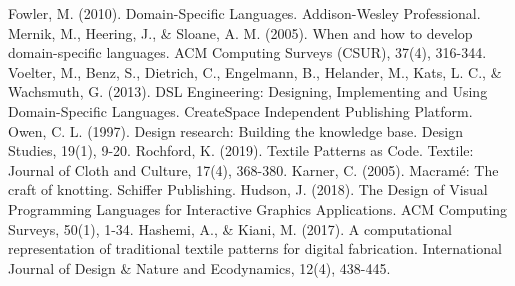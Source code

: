 \documentclass[conference]{IEEEtran}
\begin{document}
\begin{thebibliography}{00}
 Fowler, M. (2010). Domain-Specific Languages. Addison-Wesley Professional.
 Mernik, M., Heering, J., \& Sloane, A. M. (2005). When and how to develop domain-specific languages. ACM Computing Surveys (CSUR), 37(4), 316-344.
 Voelter, M., Benz, S., Dietrich, C., Engelmann, B., Helander, M., Kats, L. C., \& Wachsmuth, G. (2013). DSL Engineering: Designing, Implementing and Using Domain-Specific Languages. CreateSpace Independent Publishing Platform.
 Owen, C. L. (1997). Design research: Building the knowledge base. Design Studies, 19(1), 9-20.
 Rochford, K. (2019). Textile Patterns as Code. Textile: Journal of Cloth and Culture, 17(4), 368-380.
 Karner, C. (2005). Macramé: The craft of knotting. Schiffer Publishing.
 Hudson, J. (2018). The Design of Visual Programming Languages for Interactive Graphics Applications. ACM Computing Surveys, 50(1), 1-34.
 Hashemi, A., \& Kiani, M. (2017). A computational representation of traditional textile patterns for digital fabrication. International Journal of Design \& Nature and Ecodynamics, 12(4), 438-445.
\end{thebibliography}
\end{document}
